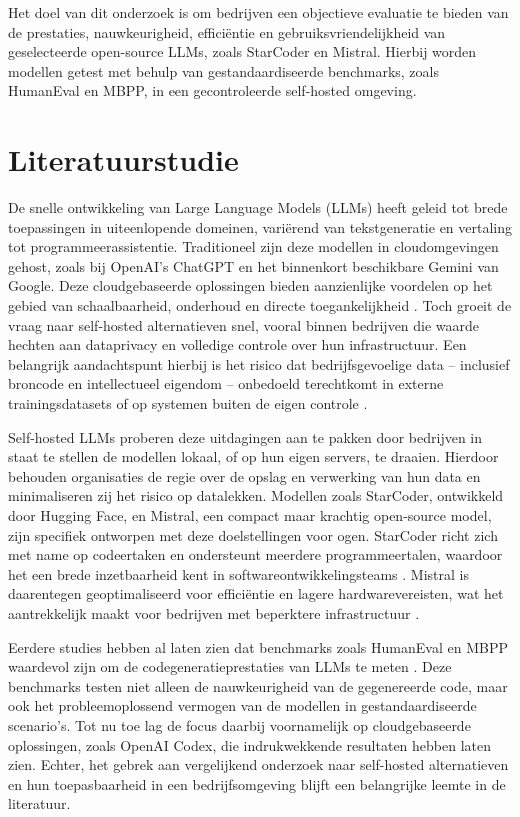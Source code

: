 Het doel van dit onderzoek is om bedrijven een objectieve evaluatie te bieden van de prestaties, nauwkeurigheid, efficiëntie en gebruiksvriendelijkheid van geselecteerde open-source LLMs, zoals StarCoder en Mistral. Hierbij worden modellen getest met behulp van gestandaardiseerde benchmarks, zoals HumanEval en MBPP, in een gecontroleerde self-hosted omgeving.


\section{Literatuurstudie}%
\label{sec:literatuurstudie}

De snelle ontwikkeling van Large Language Models (LLMs) heeft geleid tot brede toepassingen in uiteenlopende domeinen, variërend van tekstgeneratie en vertaling tot programmeerassistentie. Traditioneel zijn deze modellen in cloudomgevingen gehost, zoals bij OpenAI's ChatGPT en het binnenkort beschikbare Gemini van Google. Deze cloudgebaseerde oplossingen bieden aanzienlijke voordelen op het gebied van schaalbaarheid, onderhoud en directe toegankelijkheid \autocite{Brown2020}. Toch groeit de vraag naar self-hosted alternatieven snel, vooral binnen bedrijven die waarde hechten aan dataprivacy en volledige controle over hun infrastructuur. Een belangrijk aandachtspunt hierbij is het risico dat bedrijfsgevoelige data – inclusief broncode en intellectueel eigendom – onbedoeld terechtkomt in externe trainingsdatasets of op systemen buiten de eigen controle \autocite{Rao2023}.

Self-hosted LLMs proberen deze uitdagingen aan te pakken door bedrijven in staat te stellen de modellen lokaal, of op hun eigen servers, te draaien. Hierdoor behouden organisaties de regie over de opslag en verwerking van hun data en minimaliseren zij het risico op datalekken. Modellen zoals StarCoder, ontwikkeld door Hugging Face, en Mistral, een compact maar krachtig open-source model, zijn specifiek ontworpen met deze doelstellingen voor ogen. StarCoder richt zich met name op codeertaken en ondersteunt meerdere programmeertalen, waardoor het een brede inzetbaarheid kent in softwareontwikkelingsteams \autocite{Li2022, Tunstall2023}. Mistral is daarentegen geoptimaliseerd voor efficiëntie en lagere hardwarevereisten, wat het aantrekkelijk maakt voor bedrijven met beperktere infrastructuur \autocite{Mistral2023, Team2023}.

Eerdere studies hebben al laten zien dat benchmarks zoals HumanEval en MBPP waardevol zijn om de codegeneratieprestaties van LLMs te meten \autocite{Chen2021}. Deze benchmarks testen niet alleen de nauwkeurigheid van de gegenereerde code, maar ook het probleemoplossend vermogen van de modellen in gestandaardiseerde scenario’s. Tot nu toe lag de focus daarbij voornamelijk op cloudgebaseerde oplossingen, zoals OpenAI Codex, die indrukwekkende resultaten hebben laten zien. Echter, het gebrek aan vergelijkend onderzoek naar self-hosted alternatieven en hun toepasbaarheid in een bedrijfsomgeving blijft een belangrijke leemte in de literatuur.

